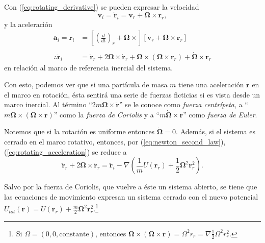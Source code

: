 Con (\ref{eq:rotating_derivative}) se pueden expresar la velocidad 
\begin{equation}
 \mathbf{v}_i = \dot{\mathbf{r}}_i = \mathbf{v}_r + \mathbf{\Omega} \times \mathbf{r}_r,
 \label{eq:rotating_velocity}
\end{equation}
y la aceleración
\begin{align}
 \mathbf{a}_i = \ddot{\mathbf{r}}_i &= \left[ \left( \frac{d}{dt}\right)_r + \mathbf{\Omega} \times \right]\left[ \mathbf{v}_r + \mathbf{\Omega} \times \mathbf{r}_r \right] \nonumber \\
 \nonumber \\
 \therefore \ddot{\mathbf{r}}_i &= \ddot{\mathbf{r}}_r + 2\mathbf{\Omega} \times \mathbf{\dot{r}}_r + \mathbf{\Omega} \times \left( \mathbf{\Omega} \times \mathbf{r}_r \right) + \dot{\mathbf{\Omega}} \times \mathbf{r}_r
 \label{eq:rotating_acceleration}
\end{align}
en relación al marco de referencia inercial del sistema. 

Con esto, podemos ver que si una partícula de masa $m$ tiene una aceleración $\ddot{\mathbf{r}}$ en el marco en rotación, ésta sentirá una serie de fuerzas ficticias si es vista desde un marco inercial. Al término ``$2 m \mathbf{\Omega} \times \dot{\mathbf{r}}$'' se le conoce como \textit{fuerza centrípeta}, a ``$m \mathbf{\Omega} \times ( \mathbf{\Omega} \times \mathbf{r} )$'' como la \textit{fuerza de Coriolis} y a ``$m \dot{\mathbf{\Omega}} \times \mathbf{r}$'' como \textit{fuerza de Euler}.

Notemos que si la rotación es uniforme entonces $\dot{\mathbf{\Omega}} = 0$. Además, si el sistema es cerrado en el marco rotativo, entonces, por (\ref{eq:newton_second_law}), (\ref{eq:rotating_acceleration}) se reduce a 
\begin{equation}
 \ddot{\mathbf{r}}_r + 2\mathbf{\Omega} \times \dot{\mathbf{r}}_r = \ddot{\mathbf{r}}_i - \nabla \left( \frac{1}{m}U(\mathbf{r}_r) +  \frac{1}{2} \mathbf{\Omega}^2 \mathbf{r}_r^2 \right).
 \label{eq:rotating_constant_acceleration}
\end{equation}

Salvo por la fuerza de Coriolis, que vuelve a éste un sistema abierto, se tiene que las ecuaciones de movimiento expresan un sistema cerrado con el nuevo potencial $U_{tot}(\mathbf{r}) = U(\mathbf{r}_r) + \frac{m}{2} \mathbf{\Omega}^2 \mathbf{r}_r^2$.\footnote{Si $\Omega = (0,0,\text{constante})$, entonces $\mathbf{\Omega} \times ( \mathbf{\Omega} \times \mathbf{r} ) =\Omega^2 r_r = \nabla \frac{1}{2}\Omega^2 r_r^2$.}

